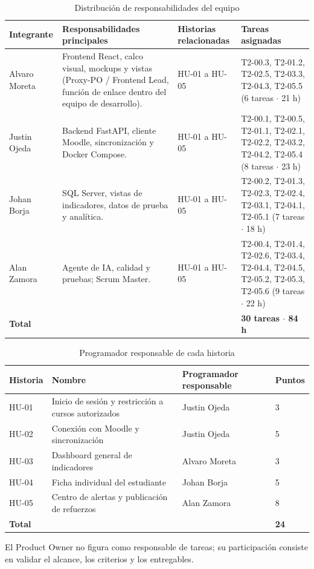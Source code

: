 \documentclass[11pt,a4paper]{article}
\newcommand{\hd}[1]{\textbf{#1}}
\begin{document}
\begin{table}[H]
\centering\small
\caption{Distribución de responsabilidades del equipo}
\begin{tabularx}{\textwidth}{|R{2.2cm}|R{3.8cm}|R{2.0cm}|Y|}
\hline
\hd{Integrante} & \hd{Responsabilidades principales} & \hd{Historias relacionadas} & \hd{Tareas asignadas}\\ \hline
Alvaro Moreta & Frontend React, calco visual, mockups y vistas (Proxy-PO / Frontend Lead, función de enlace dentro del equipo de desarrollo). & HU-01 a HU-05 & T2-00.3, T2-01.2, T2-02.5, T2-03.3, T2-04.3, T2-05.5 (6 tareas $\cdot$ 21 h)\\ \hline
Justin Ojeda & Backend FastAPI, cliente Moodle, sincronización y Docker Compose. & HU-01 a HU-05 & T2-00.1, T2-00.5, T2-01.1, T2-02.1, T2-02.2, T2-03.2, T2-04.2, T2-05.4 (8 tareas $\cdot$ 23 h)\\ \hline
Johan Borja & SQL Server, vistas de indicadores, datos de prueba y analítica. & HU-01 a HU-05 & T2-00.2, T2-01.3, T2-02.3, T2-02.4, T2-03.1, T2-04.1, T2-05.1 (7 tareas $\cdot$ 18 h)\\ \hline
Alan Zamora & Agente de IA, calidad y pruebas; Scrum Master. & HU-01 a HU-05 & T2-00.4, T2-01.4, T2-02.6, T2-03.4, T2-04.4, T2-04.5, T2-05.2, T2-05.3, T2-05.6 (9 tareas $\cdot$ 22 h)\\ \hline
\textbf{Total} & & & \textbf{30 tareas $\cdot$ 84 h}\\ \hline
\end{tabularx}
\end{table}

\begin{table}[H]
\centering\small
\caption{Programador responsable de cada historia}
\begin{tabularx}{\textwidth}{|R{1.6cm}|Y|R{3.0cm}|R{1.4cm}|}
\hline
\hd{Historia} & \hd{Nombre} & \hd{Programador responsable} & \hd{Puntos}\\ \hline
HU-01 & Inicio de sesión y restricción a cursos autorizados & Justin Ojeda & 3\\ \hline
HU-02 & Conexión con Moodle y sincronización & Justin Ojeda & 5\\ \hline
HU-03 & Dashboard general de indicadores & Alvaro Moreta & 3\\ \hline
HU-04 & Ficha individual del estudiante & Johan Borja & 5\\ \hline
HU-05 & Centro de alertas y publicación de refuerzos & Alan Zamora & 8\\ \hline
\textbf{Total} & & & \textbf{24}\\ \hline
\end{tabularx}
\end{table}
El Product Owner no figura como responsable de tareas; su participación consiste en validar el alcance, los criterios y los entregables.
\end{document}
